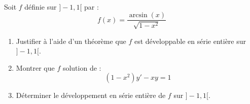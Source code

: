 \documentclass[french,11pt,twoside]{VcCours}
\begin{document}
\newpage

$\phantom{test}$

\vspace{7cm}
\begin{ApplicationDirecte}
Soit $f$ définie sur $]-1,1[$ par :
$$ f(x) = \dfrac{\arcsin(x)}{\sqrt{1-x^2}}$$
\begin{enumerate}
\item Justifier à l'aide d'un théorème que $f$ est développable en série entière sur $]-1,1[$.
\item Montrer que $f$ solution de :
$$ (1-x^2)y'-xy=1$$
\item Déterminer le développement en série entière de $f$ sur $]-1,1[$.
\end{enumerate}
\end{ApplicationDirecte}
\end{document}
